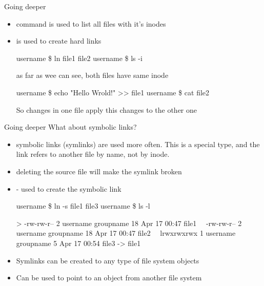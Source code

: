 \documentclass[usenames,dvipsnames,10pt,aspectratio=169]{beamer}
\begin{document}
\begin{frame}{Going deeper}
    \begin{itemize}
        \item {} command is used to list all files with it's inodes
        \item {} is used to create hard links
        \begin{examples}
            username \$ ln file1 file2 \newline
            username \$ ls -i \newline
        \end{examples}
        as far as wee can see, both files have same inode
        \begin{examples}
        username \$ echo "Hello Wrold!" >> file1 \newline
        username \$ cat file2 \newline
        \end{examples}
        So changes in one file apply this changes to the other one \newline
    \end{itemize}
\end{frame}

\begin{frame}{Going deeper}
    What about symbolic links?
    \begin{itemize}
        \item symbolic links (symlinks) are used more often. This is a special type, and the link refers to another file by name, not by inode.
        \item deleting the source file will make the symlink broken
        \item {} - used to create the symbolic link
        \begin{examples}
        username \$ ln -s file1 file3 \newline
        username \$ ls -l \newline
        
        > -rw-rw-r-- 2 username groupname 18 Apr 17 00:47 file1 \newline
        \, \, -rw-rw-r-- 2 username groupname 18 Apr 17 00:47 file2 \newline
        \, \, lrwxrwxrwx 1 username groupname  5 Apr 17 00:54 file3 -> file1
        \end{examples}
        \item Symlinks can be created to any type of file system objects
        \item Can be used to point to an object from another file system
    \end{itemize}
\end{frame}
\end{document}

